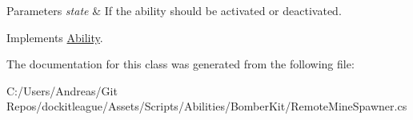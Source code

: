 \begin{DoxyParams}{Parameters}
{\em state} & If the ability should be activated or deactivated.\\
\hline
\end{DoxyParams}


Implements \hyperlink{class_ability_a10f7f3c2b63eeef6e352aee48d246384}{Ability}.



The documentation for this class was generated from the following file\+:\begin{DoxyCompactItemize}
\item 
C\+:/\+Users/\+Andreas/\+Git Repos/dockitleague/\+Assets/\+Scripts/\+Abilities/\+Bomber\+Kit/Remote\+Mine\+Spawner.\+cs\end{DoxyCompactItemize}
